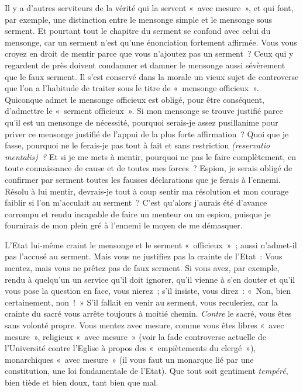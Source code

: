 \documentclass[french,twoside]{book} %
\begin{document}
Il y a d’autres serviteurs de la vérité qui la servent « avec mesure », et qui font, par exemple, une distinction entre le mensonge simple et le mensonge sous serment. Et pourtant tout le chapitre du serment se confond avec celui du mensonge, car un serment n’est qu’une énonciation fortement affirmée. Vous vous croyez en droit de mentir parce que vous n’ajoutez pas un serment ? Ceux qui y regardent de près doivent condamner et damner le mensonge aussi sévèrement que le faux serment. Il s’est conservé dans la morale un vieux sujet de controverse que l’on a l’habitude de traiter sous le titre de « mensonge officieux ». Quiconque admet le mensonge officieux est obligé, pour être conséquent, d’admettre le « serment officieux ». Si mon mensonge se trouve justifié parce qu’il est un mensonge de nécessité, pourquoi serais-je assez pusillanime pour priver ce mensonge justifié de l’appui de la plus forte affirmation ? Quoi que je fasse, pourquoi ne le ferais-je pas tout à fait et sans restriction \emph{(reservatio mentalis) ?} Et si je me mets à mentir, pourquoi ne pas le faire complètement, en toute connaissance de cause et de toutes mes forces ? Espion, je serais obligé de confirmer par serment toutes les fausses déclarations que je ferais à l’ennemi. Résolu à lui mentir, devrais-je tout à coup sentir ma résolution et mon courage  faiblir si l’on m’acculait au serment ? C’est qu’alors j’aurais été d’avance corrompu et rendu incapable de faire un menteur ou un espion, puisque je fournirais de mon plein gré à l’ennemi le moyen de me démasquer.\par
L’Etat lui-même craint le mensonge et le serment « officieux » ; aussi n’admet-il pas l’accusé au serment. Mais vous ne justifiez pas la crainte de l’Etat : Vous mentez, mais vous ne prêtez pas de faux serment. Si vous avez, par exemple, rendu à quelqu’un un service qu’il doit ignorer, qu’il vienne à s’en douter et qu’il vous pose la question en face, vous nierez ; s’il insiste, vous direz : « Non, bien certainement, non ! » S’il fallait en venir au serment, vous reculeriez, car la crainte du sacré vous arrête toujours à moitié chemin. \emph{Contre} le sacré, vous êtes sans volonté propre. Vous mentez avec mesure, comme vous êtes libres « avec mesure », religieux « avec mesure » (voir la fade controverse actuelle de l’Université contre l’Eglise à propos des « empiètements du clergé »), monarchiques « avec mesure » (il vous faut un monarque lié par une constitution, une loi fondamentale de l’Etat). Que tout soit gentiment \emph{tempéré}, bien tiède et bien doux, tant bien que mal.\par
\end{document}
